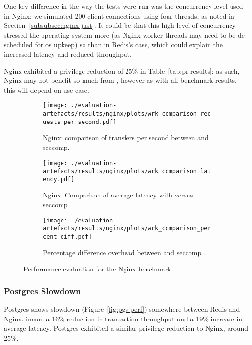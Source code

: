 One key difference in the way the tests were run was the concurrency level used
in Nginx: we simulated 200 client connections using four threads, as noted in
Section~\ref{subsubsec:nginx-just}. It could be that this high level of
concurrency stressed the operating system more (as Nginx worker threads may need
to be de-scheduled for \ac{os} upkeep) so than in Redis's case, which could
explain the increased latency and reduced throughput.

Nginx exhibited a privilege reduction of 25\% in Table~\ref{tab:pr-results}: as
such, Nginx may not benefit so much from \af, however as with all benchmark
results, this will depend on use case.

\begin{figure}[htbp]
    \centering
    \begin{subfigure}[b]{0.75 \textwidth}
        \centering
        \texttt{[image: ./evaluation-artefacts/results/nginx/plots/wrk\_comparison\_requests\_per\_second.pdf]} 
        \caption{Nginx: comparison of transfers per second between \af and
        seccomp.}
        \label{fig:nginx-rps}
    \end{subfigure}
    \hfill
     \begin{subfigure}[b]{0.45 \textwidth}
        \centering
        \texttt{[image: ./evaluation-artefacts/results/nginx/plots/wrk\_comparison\_latency.pdf]} 
        \caption{Nginx: Comparison of average latency with \af versus
        seccomp}
        \label{fig:nginx-time}
    \end{subfigure}
     \medskip 
     \begin{subfigure}[b]{0.45 \textwidth}
        \centering
        \texttt{[image: ./evaluation-artefacts/results/nginx/plots/wrk\_comparison\_percent\_diff.pdf]} %
        \caption{Percentage difference overhead between \af and seccomp}
        \label{fig:nginx-percdiff}
    \end{subfigure}

    \caption{Performance evaluation for the Nginx benchmark.}
    \label{fig:nginx-perf}
\end{figure}

\subsubsection{Postgres Slowdown}\label{subsubsec:postgres-slowdown}

Postgres shows slowdown (Figure~\ref{fig:pgs-perf}) somewhere between Redis and Nginx. \af incurs a 16\% reduction in transaction throughput and
a 19\% increase in average latency. Postgres exhibited a similar privilege
reduction to Nginx, around 25\%. 

